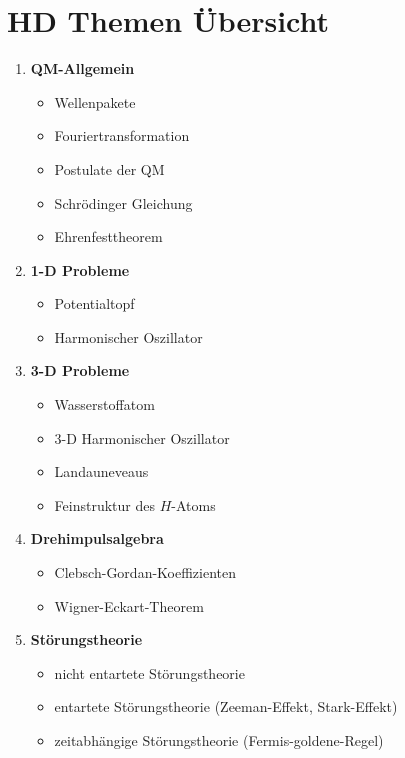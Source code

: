 



\section*{HD Themen Übersicht}

\begin{enumerate}
\item \textbf{QM-Allgemein}

  \begin{itemize}
  \item Wellenpakete
   \item Fouriertransformation
   \item Postulate der QM
   \item Schrödinger Gleichung
   \item Ehrenfesttheorem
  \end{itemize}

\item \textbf{1-D Probleme}

  \begin{itemize}
  \item Potentialtopf
   \item Harmonischer Oszillator
  \end{itemize}

\item \textbf{3-D Probleme}

  \begin{itemize}
  \item Wasserstoffatom
   \item 3-D Harmonischer Oszillator
   \item Landauneveaus
   \item Feinstruktur des \(H\)-Atoms
  \end{itemize}


\item \textbf{Drehimpulsalgebra}

  \begin{itemize}
  \item Clebsch-Gordan-Koeffizienten
   \item Wigner-Eckart-Theorem
  \end{itemize}


\item \textbf{Störungstheorie}

  \begin{itemize}
  \item nicht entartete Störungstheorie
   \item entartete Störungstheorie (Zeeman-Effekt, Stark-Effekt)
   \item zeitabhängige Störungstheorie (Fermis-goldene-Regel)
  \end{itemize}


\end{enumerate}
